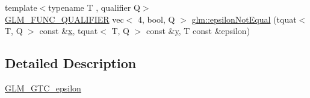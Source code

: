 \begin{DoxyCompactItemize}
\item 
{\footnotesize template$<$typename T , qualifier Q$>$ }\\\mbox{\hyperlink{setup_8hpp_a33fdea6f91c5f834105f7415e2a64407}{G\+L\+M\+\_\+\+F\+U\+N\+C\+\_\+\+Q\+U\+A\+L\+I\+F\+I\+ER}} vec$<$ 4, bool, Q $>$ \mbox{\hyperlink{namespaceglm_a0feea019d5228d3fdab3b21a7cd32dcd}{glm\+::epsilon\+Not\+Equal}} (tquat$<$ T, Q $>$ const \&\mbox{\hyperlink{_s_d_l__opengl_8h_ad0e63d0edcdbd3d79554076bf309fd47}{x}}, tquat$<$ T, Q $>$ const \&\mbox{\hyperlink{_s_d_l__opengl_8h_a1675d9d7bb68e1657ff028643b4037e3}{y}}, T const \&epsilon)
\end{DoxyCompactItemize}


\subsection{Detailed Description}
\mbox{\hyperlink{group__gtc__epsilon}{G\+L\+M\+\_\+\+G\+T\+C\+\_\+epsilon}} 